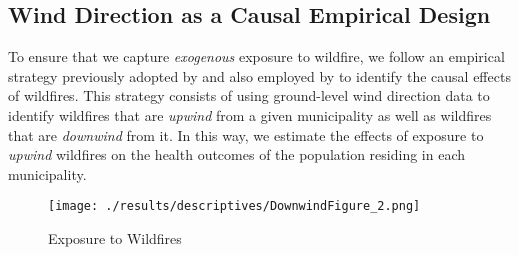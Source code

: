 \documentclass[11pt]{article}
\begin{document}
\begin{spacing}{1.3}
\subsection{Wind Direction as a Causal Empirical Design}
\label{sscn:design}
To ensure that we capture \emph{exogenous} exposure to wildfire, we follow an empirical strategy previously adopted by \cite{RangelVogl2019} and also employed by \cite{zivin2020unintended} to identify the causal effects of wildfires. This strategy consists of using ground-level wind direction data to identify wildfires that are \textit{upwind} from a given municipality as well as wildfires that are \textit{downwind} from it. In this way, we estimate the effects of exposure to \textit{upwind} wildfires on the health outcomes of the population residing in each municipality. 






\begin{figure}[htpb!]
    \centering
    \vspace{1mm}
    \texttt{[image: ./results/descriptives/DownwindFigure\_2.png]}
    \caption{Exposure to Wildfires}
    \label{fig:Downwind_Fig}
    \vspace{2mm}
\end{figure}


\end{spacing}
\end{document}
